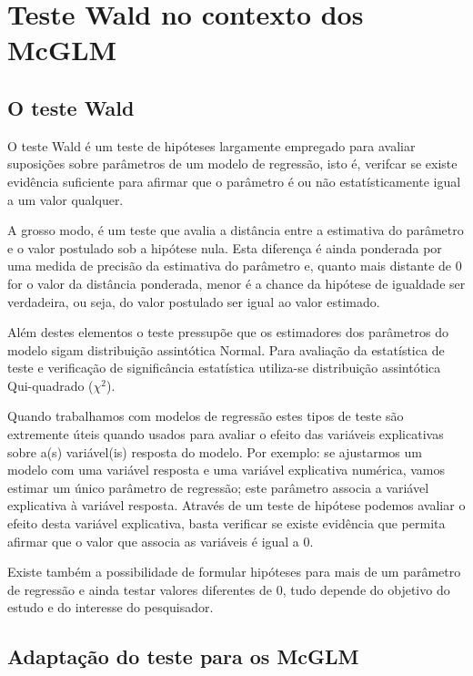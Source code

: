 
\chapter{Teste Wald no contexto dos McGLM}

\label{cap:wald}


\section{O teste Wald}

O teste Wald é um teste de hipóteses largamente empregado para avaliar suposições sobre parâmetros de um modelo de regressão, isto é, verifcar se existe evidência suficiente para afirmar que o parâmetro é ou não estatísticamente igual a um valor qualquer.

A grosso modo, é um teste que avalia a distância entre a estimativa do parâmetro e o valor postulado sob a hipótese nula. Esta diferença é ainda ponderada por uma medida de precisão da estimativa do parâmetro e, quanto mais distante de 0 for o valor da distância ponderada, menor é a chance da hipótese de igualdade ser verdadeira, ou seja, do valor postulado ser igual ao valor estimado.

Além destes elementos o teste pressupõe que os estimadores dos parâmetros do modelo sigam distribuição assintótica Normal. Para avaliação da estatística de teste e verificação de significância estatística utiliza-se distribuição assintótica Qui-quadrado ($\chi^2$).

Quando trabalhamos com modelos de regressão estes tipos de teste são extremente úteis quando usados para avaliar o efeito das variáveis explicativas sobre a(s) variável(is) resposta do modelo. Por exemplo: se ajustarmos um modelo com uma variável resposta e uma variável explicativa numérica, vamos estimar um único parâmetro de regressão; este parâmetro associa a variável explicativa à variável resposta. Através de um teste de hipótese podemos avaliar o efeito desta variável explicativa, basta verificar se existe evidência que permita afirmar que o valor que associa as variáveis é igual a 0. 

Existe também a possibilidade de formular hipóteses para mais de um parâmetro de regressão e ainda testar valores diferentes de 0, tudo depende do objetivo do estudo e do interesse do pesquisador. 

\section{Adaptação do teste para os McGLM}

